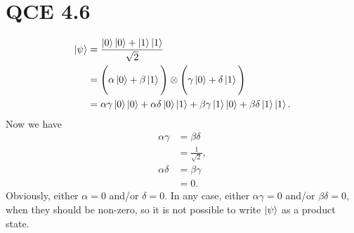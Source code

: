 \documentclass[10pt]{article}
\begin{document}
\section*{QCE 4.6}
\begin{align*}
\ket{\psi} &= \frac{\ket{0} \ket{0} + \ket{1} \ket{1}}{\sqrt{2}} \\
				&= \Bigg( \alpha \ket{0} + \beta \ket{1} \Bigg) \otimes \Bigg( \gamma \ket{0} + \delta \ket{1} \Bigg) \\
				&= \alpha \gamma \ket{0} \ket{0} + \alpha \delta \ket{0} \ket{1} + \beta \gamma \ket{1} \ket{0} + \beta \delta \ket{1} \ket{1}.
\end{align*}
Now we have
\begin{align*}
\alpha \gamma &= \beta \delta \\
						 &= \frac{1}{\sqrt{2}}, \\
\alpha \delta &= \beta \gamma \\
					  &= 0.
\end{align*}
Obviously, either $\alpha = 0$ and/or $\delta = 0$. In any case, either $\alpha\gamma = 0$ and/or $\beta \delta = 0$, when they should be non-zero, so it is not possible to write $\ket{\psi}$ as a product state. 
\end{document}
